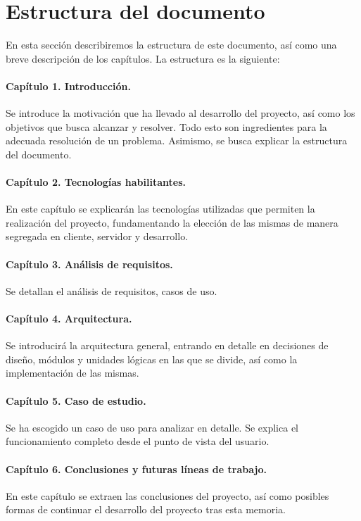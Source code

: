 \section{Estructura del documento}
\label{sec:structure-of-document}

En esta sección describiremos la estructura de este documento, así como una breve descripción de los capítulos. La estructura es la siguiente:

\paragraph{Capítulo 1. Introducción.}

Se introduce la motivación que ha llevado al desarrollo del proyecto, así como los objetivos que busca alcanzar y resolver. Todo esto son ingredientes para la adecuada resolución de un problema. Asimismo, se busca explicar la estructura del documento.

\paragraph{Capítulo 2. Tecnologías habilitantes.}

En este capítulo se explicarán las tecnologías utilizadas que permiten la realización del proyecto, fundamentando la elección de las mismas de manera segregada en cliente, servidor y desarrollo.

\paragraph{Capítulo 3. Análisis de requisitos.}

Se detallan el análisis de requisitos, casos de uso.

\paragraph{Capítulo 4. Arquitectura.}

Se introducirá la arquitectura general, entrando en detalle en decisiones de diseño, módulos y unidades lógicas en las que se divide, así como la  implementación de las mismas.

\paragraph{Capítulo 5. Caso de estudio.}

Se ha escogido un caso de uso para analizar en detalle. Se explica el funcionamiento completo desde el punto de vista del usuario.

\paragraph{Capítulo 6. Conclusiones y futuras líneas de trabajo.}

En este capítulo se extraen las conclusiones del proyecto, así como posibles formas de continuar el desarrollo del proyecto tras esta memoria.
